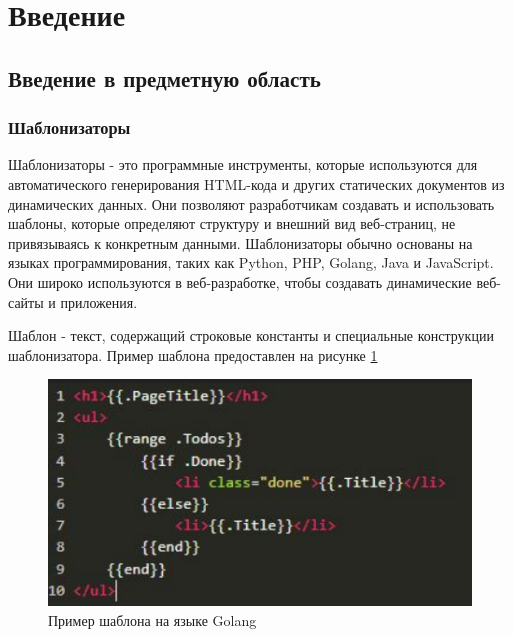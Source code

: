 \documentclass[a4paper]{article}
\begin{document}
\newpage
\section{Введение}

\subsection{Введение в предметную область}

\subsubsection{Шаблонизаторы}
\indent
Шаблонизаторы - это программные инструменты, которые используются для автоматического генерирования HTML-кода и других статических документов из динамических данных. Они позволяют разработчикам создавать и использовать шаблоны, которые определяют структуру и внешний вид веб-страниц, не привязываясь к конкретным данными. Шаблонизаторы обычно основаны на языках программирования, таких как Python, PHP, Golang, Java и JavaScript. Они широко используются в веб-разработке, чтобы создавать динамические веб-сайты и приложения.

Шаблон - текст, содержащий строковые константы и специальные конструкции шаблонизатора. Пример шаблона предоставлен на рисунке \ref{GolangExample}

\begin{figure}[ht!]
\includegraphics[width=140mm]{SimpleGoTemplate.png}
\caption{Пример шаблона на языке Golang}
\label{GolangExample}
\end{figure}
\end{document}
